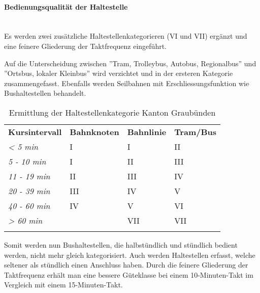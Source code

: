 \paragraph{Bedienungsqualität der Haltestelle}~\\
\label{Berechnungsmethodik Kanton Graubünden:Bedienungsqualität der Haltestelle}
Es werden zwei zusätzliche Haltestellenkategorieren (VI und VII) ergänzt und eine feinere Gliederung der Taktfrequenz eingeführt.

Auf die Unterscheidung zwischen ''Tram, Trolleybus, Autobus, Regionalbus'' und ''Ortsbus, lokaler Kleinbus'' wird verzichtet und in der ersteren Kategorie zusammengefasst.
Ebenfalls werden Seilbahnen mit Erschliessungsfunktion wie Bushaltestellen behandelt.

\begin{longtable}[c]{l p{4.0cm} p{4.0cm} p{4.0cm}}
        \midrule
        \textbf{Kursintervall}
                                & \textbf{Bahnknoten}
                                & \textbf{Bahnlinie}
                                & \textbf{Tram/Bus}\\
        \textit{< 5 min}
                                & I
                                & I
                                & II\\
        \cellcolor{red!25}\textit{5 - 10 min}
                                & I
                                & II
                                & III\\
        \cellcolor{red!25}\textit{11 - 19 min}
                                & II
                                & III
                                & IV\\
        \textit{20 - 39 min}
                                & III
                                & IV
                                & V\\
        \textit{40 - 60 min}
                                & IV
                                & V
                                & \cellcolor{red!25}VI\\
        \cellcolor{red!25}\textit{> 60 min}
                                &
                                & \cellcolor{red!25}VII
                                & \cellcolor{red!25}VII\\
        \bottomrule
    \caption{Ermittlung der Haltestellenkategorie Kanton Graubünden}
    \label{table:Ermittlung der Haltestellenkategorie Kanton Graubünden}
\end{longtable}

Somit werden nun Bushaltestellen, die halbstündlich und stündlich bedient werden, nicht mehr gleich kategorisiert.
Auch werden Haltestellen erfasst, welche seltener als stündlich einen Anschluss haben.
Durch die feinere Gliederung der Taktfrequenz erhält man eine bessere Güteklasse bei einem 10-Minuten-Takt im Vergleich mit einem 15-Minuten-Takt.


